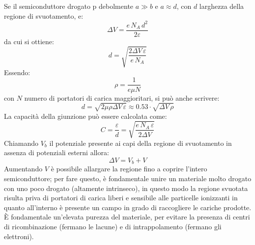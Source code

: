 Se il semiconduttore drogato p debolmente $a \gg b$ e $a \approx d$, con $d$ larghezza della regione di svuotamento, e:
\begin{equation*}
\Delta V = \frac{e \, N_A \, d^2}{2 \varepsilon}
\end{equation*}
da cui si ottiene:
\begin{equation*}
d = \sqrt{\frac{2 \Delta V \, \varepsilon}{e \, N_A}}
\end{equation*}
Essendo:
\begin{equation*}
\rho = \frac{1}{e \mu N}
\end{equation*}
con $N$ numero di portatori di carica maggioritari, si pu\`o anche scrivere:
\begin{equation*}
d = \sqrt{2 \mu \rho \Delta V \, \varepsilon} \approx 0.53 \cdot \sqrt{\Delta V \, \rho}
\end{equation*}
La capacit\`a della giunzione pu\`o essere calcolata come:
\begin{equation*}
C = \frac{\varepsilon}{d} = \sqrt{\frac{e \, N_A \, \varepsilon}{2 \Delta V }}
\end{equation*}
Chiamando $V_b$ il potenziale presente ai capi della regione di svuotamento in assenza di potenziali esterni allora:
\begin{equation*}
\Delta V = V_b + V
\end{equation*}
Aumentando $V$ \`e possibile allargare la regione fino a coprire l'intero semiconduttore; per fare questo, \`e fondamentale unire
un materiale molto drogato con uno poco drogato (altamente intrinseco), in questo modo la regione svuotata risulta priva di portatori
di carica liberi e sensibile alle particelle ionizzanti in quanto all'interno \`e presente un campo in grado di raccogliere le cariche prodotte.
\`E fondamentale un'elevata purezza del materiale, per evitare la presenza di centri di ricombinazione (fermano le lacune) e di intrappolamento (fermano gli elettroni).
